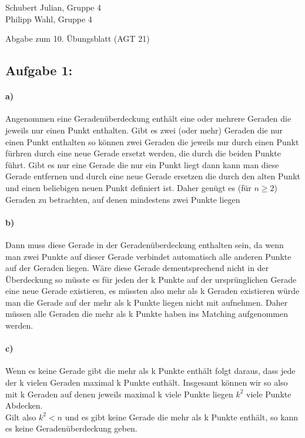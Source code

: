 \documentclass[a4paper]{article}
\begin{document}
\begin{small}
    \noindent
    Schubert Julian, Gruppe 4 \\
    Philipp Wahl, Gruppe 4
\end{small}
\bigskip

\begin{center}
    \LARGE Abgabe zum 10. Übungsblatt (AGT 21)
\end{center}
\smallskip
\subsection*{Aufgabe 1:}
\paragraph*{a)}
Angenommen eine Geradenüberdeckung enthält eine oder mehrere Geraden die jeweils
nur einen Punkt enthalten. Gibt es zwei (oder mehr) Geraden die nur einen Punkt enthalten
so können zwei Geraden die jeweils nur durch einen Punkt fürhren durch eine neue Gerade 
ersetzt werden, die durch die beiden Punkte führt. Gibt es nur eine Gerade die nur 
ein Punkt liegt dann kann man diese Gerade entfernen und durch eine neue Gerade ersetzen
die durch den alten Punkt und einen beliebigen neuen Punkt definiert ist. Daher genügt es
(für $n \geq 2$) Geraden zu betrachten, auf denen mindestens zwei Punkte liegen
\paragraph*{b)}
Dann muss diese Gerade in der Geradenüberdeckung enthalten sein, da wenn man zwei Punkte
auf dieser Gerade verbindet automatisch alle anderen Punkte auf der Geraden liegen. Wäre
diese Gerade dementsprechend nicht in der Überdeckung so müsste es für jeden der k Punkte
auf der ursprünglichen Gerade eine neue Gerade existieren, es müssten also mehr als k 
Geraden existieren würde man die Gerade auf der mehr als k Punkte liegen nicht mit aufnehmen.
Daher müssen alle Geraden die mehr als k Punkte haben ins Matching aufgenommen werden.
\paragraph*{c)}
Wenn es keine Gerade gibt die mehr als k Punkte enthält folgt daraus, dass jede der 
k vielen Geraden maximal k Punkte enthält. Insgesamt können wir so also mit k Geraden
auf denen jeweils maximal k viele Punkte liegen $k^2$ viele Punkte Abdecken. \\
Gilt also $k^2 < n$ und es gibt keine Gerade die mehr als k Punkte enthält, so kann
es keine Geradenüberdeckung geben.
\end{document}

